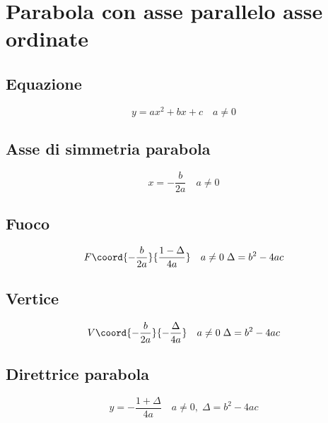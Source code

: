 
\chapter{Parabola con asse parallelo asse ordinate}
\section{Equazione}
\begin{equation}
y=ax^2+bx+c\quad a\neq0
\end{equation}
\section{Asse di simmetria parabola}
\begin{equation}
x=-\dfrac{b}{2a}\quad a\neq0
\end{equation}
\section{Fuoco}
\begin{equation}
F\coord{-\dfrac{b}{2a}}{\dfrac{1-\Delta}{4a}}\quad  a\neq0\; \Delta=b^2-4ac
\end{equation}
\section{Vertice}
\begin{equation}
V\coord{-\dfrac{b}{2a}}{-\dfrac{\Delta}{4a}}\quad  a\neq0\; \Delta=b^2-4ac
\end{equation}
\section{Direttrice parabola}
\begin{equation}
y=-\dfrac{1+\Delta}{4a}\quad  a\neq0,\; \Delta=b^2-4ac
\end{equation}
